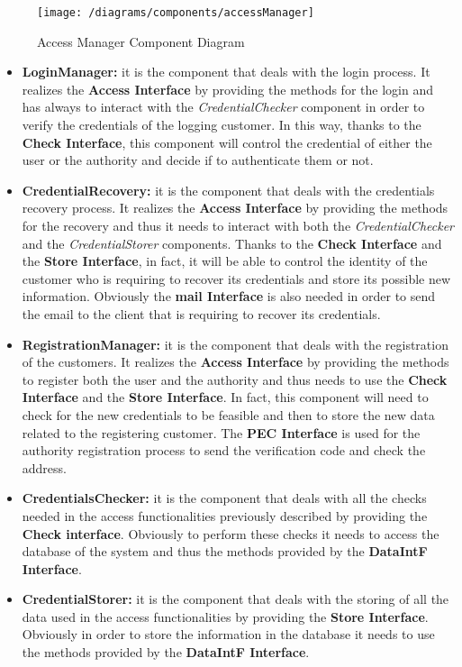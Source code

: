 			\begin{figure}[ht]
				\centering
				\texttt{[image: /diagrams/components/accessManager]}
				\caption{\label{fig:accessManagerComp} Access Manager Component Diagram}
			\end{figure}
		
			\begin{itemize}
				\item \textbf{LoginManager:} it is the component that deals with the login process. It realizes the \textbf{Access Interface} by providing the methods for the login and has always to interact with the \emph{CredentialChecker} component in order to verify the credentials of the logging customer. In this way, thanks to the \textbf{Check Interface}, this component will control the credential of either the user or the authority and decide if to authenticate them or not.
				
				\item \textbf{CredentialRecovery:} it is the component that deals with the credentials recovery process. It realizes the \textbf{Access Interface} by providing the methods for the recovery and thus it needs to interact with both the \emph{CredentialChecker} and the \emph{CredentialStorer} components. Thanks to the \textbf{Check Interface} and the \textbf{Store Interface}, in fact, it will be able to control the identity of the customer who is requiring to recover its credentials and store its possible new information. Obviously the \textbf{mail Interface} is also needed in order to send the email to the client that is requiring to recover its credentials.
				
				\item \textbf{RegistrationManager:} it is the component that deals with the registration of the customers. It realizes the \textbf{Access Interface} by providing the methods to register both the user and the authority and thus needs to use the \textbf{Check Interface} and the \textbf{Store Interface}. In fact, this component will need to check for the new credentials to be feasible and then to store the new data related to the registering customer. The \textbf{PEC Interface} is used for the authority registration process to send the verification code and check the address.
				
				\item \textbf{CredentialsChecker:} it is the component that deals with all the checks needed in the access functionalities previously described by providing the \textbf{Check interface}. Obviously to perform these checks it needs to access the database of the system and thus the methods provided by the \textbf{DataIntF Interface}.
				
				\item \textbf{CredentialStorer:} it is the component that deals with the storing of all the data used in the access functionalities by providing the \textbf{Store Interface}.
				Obviously in order to store the information in the database it needs to use the methods provided by the \textbf{DataIntF Interface}.
			\end{itemize}
		
